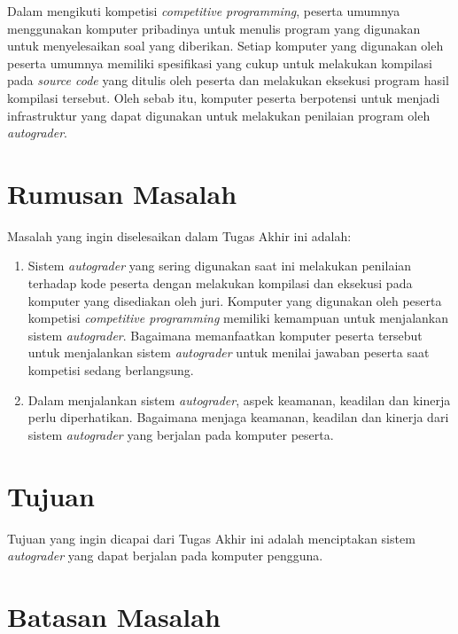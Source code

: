 \par Dalam mengikuti kompetisi \textit{competitive programming}, peserta umumnya menggunakan komputer pribadinya untuk menulis program yang digunakan untuk menyelesaikan soal yang diberikan. Setiap komputer yang digunakan oleh peserta umumnya memiliki spesifikasi yang cukup untuk melakukan kompilasi pada \textit{source code} yang ditulis oleh peserta dan melakukan eksekusi program hasil kompilasi tersebut. Oleh sebab itu, komputer peserta berpotensi untuk menjadi infrastruktur yang dapat digunakan untuk melakukan penilaian program oleh \textit{autograder}.

\section{Rumusan Masalah}

\par Masalah yang ingin diselesaikan dalam Tugas Akhir ini adalah:
\begin{enumerate}

	\item Sistem \textit{autograder} yang sering digunakan saat ini melakukan penilaian terhadap kode peserta dengan melakukan kompilasi dan eksekusi pada komputer yang disediakan oleh juri. Komputer yang digunakan oleh peserta kompetisi \textit{competitive programming} memiliki kemampuan untuk menjalankan sistem \textit{autograder}. Bagaimana memanfaatkan komputer peserta tersebut untuk menjalankan sistem \textit{autograder} untuk menilai jawaban peserta saat kompetisi sedang berlangsung.
	
	\item Dalam menjalankan sistem \textit{autograder}, aspek keamanan, keadilan dan kinerja perlu diperhatikan. Bagaimana menjaga keamanan, keadilan dan kinerja dari sistem \textit{autograder} yang berjalan pada komputer peserta.

\end{enumerate}

\section{Tujuan}

\par Tujuan yang ingin dicapai dari Tugas Akhir ini adalah menciptakan sistem \textit{autograder} yang dapat berjalan pada komputer pengguna.

\section{Batasan Masalah}

